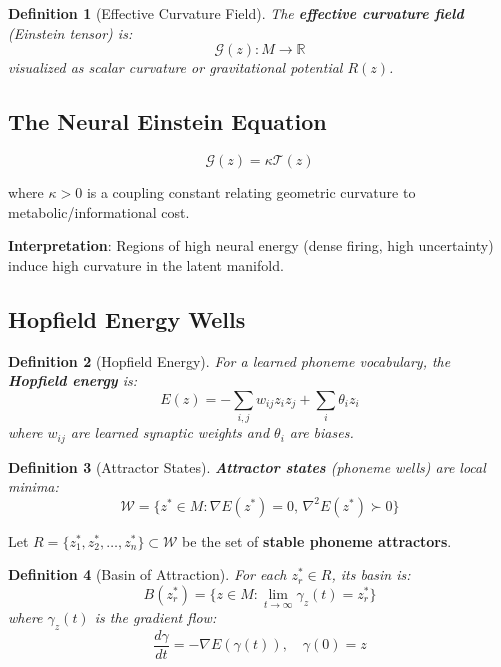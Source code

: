 \documentclass[12pt]{article}
\newtheorem{definition}{Definition}
\begin{document}
\begin{definition}[Effective Curvature Field]
The \textbf{effective curvature field} (Einstein tensor) is:
\begin{equation}
\mathcal{G}(z): M \to \mathbb{R}
\end{equation}
visualized as scalar curvature or gravitational potential $R(z)$.
\end{definition}

\subsection{The Neural Einstein Equation}

\begin{equation}\label{eq:einstein}
\boxed{\mathcal{G}(z) = \kappa \mathcal{T}(z)}
\end{equation}

where $\kappa > 0$ is a coupling constant relating geometric curvature to metabolic/informational cost.

\textbf{Interpretation}: Regions of high neural energy (dense firing, high uncertainty) induce high curvature in the latent manifold.

\subsection{Hopfield Energy Wells}

\begin{definition}[Hopfield Energy]
For a learned phoneme vocabulary, the \textbf{Hopfield energy} is:
\begin{equation}
E(z) = -\sum_{i,j} w_{ij} z_i z_j + \sum_i \theta_i z_i
\end{equation}
where $w_{ij}$ are learned synaptic weights and $\theta_i$ are biases.
\end{definition}

\begin{definition}[Attractor States]
\textbf{Attractor states} (phoneme wells) are local minima:
\begin{equation}
\mathcal{W} = \{z^* \in M : \nabla E(z^*) = 0, \, \nabla^2 E(z^*) \succ 0\}
\end{equation}
\end{definition}

Let $R = \{z_1^*, z_2^*, \ldots, z_n^*\} \subset \mathcal{W}$ be the set of \textbf{stable phoneme attractors}.

\begin{definition}[Basin of Attraction]
For each $z_r^* \in R$, its basin is:
\begin{equation}
B(z_r^*) = \{z \in M : \lim_{t \to \infty} \gamma_z(t) = z_r^*\}
\end{equation}
where $\gamma_z(t)$ is the gradient flow:
\begin{equation}
\frac{d\gamma}{dt} = -\nabla E(\gamma(t)), \quad \gamma(0) = z
\end{equation}
\end{definition}
\end{document}
